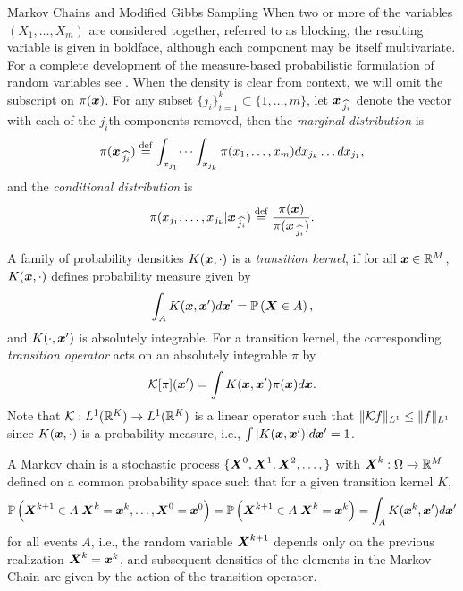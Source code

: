 \begin{chapter}{Markov Chains and Modified Gibbs Sampling}
When two or more of the variables $(X_1,\dots,X_m)$ are considered together, referred to as blocking, the resulting variable is given in boldface, although each component may be itself multivariate.
For a complete development of the measure-based probabilistic formulation of random variables see \citep{durrett2010probability,billingsley2008probability}.
When the density is clear from context, we will omit the subscript on $\pi(\mbox{\boldmath$x$})$.
For any subset $\{j_i\}_{i=1}^k \subset \{1,\dots,m\}$, let $\mbox{\boldmath$x$}_{\,\widehat{j_i}}$ denote the vector with each of the $j_i$th components removed, then the \emph{marginal distribution} is
\begin{equation}
  \pi(\mbox{\boldmath$x$}_{\,\widehat{j_i}}) \stackrel{\rm def}{=} \int_{x_{j_1}}\dots\int_{x_{j_k}} \pi(x_1,\dots,x_m)dx_{j_k}\dots dx_{j_1},
\end{equation}
and the \emph{conditional distribution} is
\begin{equation} \label{eq:conditionalDefn}
  \pi(x_{j_1},\dots,x_{j_k}|\mbox{\boldmath$x$}_{\,\widehat{j_i}}) \stackrel{\rm def}{=} \frac{\pi(\mbox{\boldmath$x$})}{\pi(\mbox{\boldmath$x$}_{\,\widehat{j_i}})}.
\end{equation}
  
A family of probability densities $K(\mbox{\boldmath$x$},\cdot)$ is a \emph{transition kernel}, if for all $\mbox{\boldmath$x$} \in \mathbb R^M$, $K(\mbox{\boldmath$x$},\cdot)$ defines probability measure given by 
\begin{equation}
  \int_A K(\mbox{\boldmath$x$},\mbox{\boldmath$x$}') d\mbox{\boldmath$x$}' = \mathbb P\left( \mbox{\boldmath$X$} \in A \right),
\end{equation}
and $K(\cdot , \mbox{\boldmath$x$}')$ is absolutely integrable.
For a transition kernel, the corresponding \emph{transition operator} acts on an absolutely integrable $\pi$ by
\begin{equation}
  \mathcal K [\pi](\mbox{\boldmath$x$}') = \int K(\mbox{\boldmath$x$},\mbox{\boldmath$x$}') \pi(\mbox{\boldmath$x$})d\mbox{\boldmath$x$}. \label{eq:transitionKernel}
\end{equation}
Note that $\mathcal K:L^1(\mathbb R^K) \to L^1(\mathbb R^K)$ is a linear operator such that $\|\mathcal K f\|_{L^1} \le \|f\|_{L^1}$ since $K(\mbox{\boldmath$x$},\cdot)$ is a probability measure, i.e., $\int |K(\mbox{\boldmath$x$},\mbox{\boldmath$x$}')|d\mbox{\boldmath$x$}' = 1$.

A Markov chain is a stochastic process $\{\mbox{\boldmath$X$}^0, \mbox{\boldmath$X$}^1,\mbox{\boldmath$X$}^2,\dots,\}$ with $\mbox{\boldmath$X$}^k:\Omega \to \mathbb R^M$ defined on a common probability space such that for a given transition kernel $K$,
\begin{equation}
  \mathbb P\left( \mbox{\boldmath$X$}^{k+1} \in A | \mbox{\boldmath$X$}^k= \mbox{\boldmath$x$}^k,\dots,\mbox{\boldmath$X$}^0=\mbox{\boldmath$x$}^0\right) 
    = \mathbb P\left( \mbox{\boldmath$X$}^{k+1} \in A | \mbox{\boldmath$X$}^k= \mbox{\boldmath$x$}^k\right) 
    = \int_A K(\mbox{\boldmath$x$}^k,\mbox{\boldmath$x$}') d\mbox{\boldmath$x$}'
\end{equation}
for all events $A$, i.e., the random variable $\mbox{\boldmath$X$}^{k+1}$ depends only on the previous realization $\mbox{\boldmath$X$}^k=\mbox{\boldmath$x$}^k$, and subsequent densities of the elements in the Markov Chain are given by the action of the transition operator.


\end{chapter}
